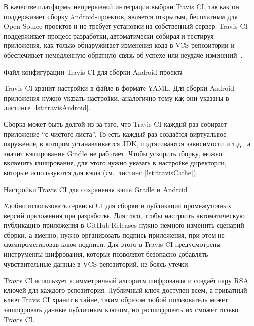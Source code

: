 В качестве платформы непрерывной интеграции выбран Travis CI, так как он поддерживает сборку Android-проектов, является открытым, бесплатным для Open Source проектов и не требует установки на собственный сервер.
Travis CI поддерживает процесс разработки, автоматически собирая и тестируя приложения, как только обнаруживает изменения кода в VCS репозитории и обеспечивает немедленную обратную связь об успехе или неудаче изменений~\cite{travis:docs}.

\begin{listing}[H]
  \caption{Файл конфигурации Travis CI для сборки Android-проекта}
  \label{lst:travisAndroid}
\end{listing}

Travis CI хранит настройки в файле  в формате YAML\@.
Для сборки Android-приложения нужно указать настройки, аналогично тому как они указаны в листинге~\ref{lst:travisAndroid}.

Сборка может быть долгой из-за того, что Travis CI каждый раз собирает приложение ``с чистого листа''.
То есть каждый раз создаётся виртуальное окружение, в котором устанавливается JDK, подтягиваются зависимости и т.д., а значит кэширование Gradle не работает.
Чтобы ускорить сборку, можно включить кэширование, для этого нужно указать в настройке  директории, которые используются для кэша (см.~листинг~\ref{lst:travisCache}).

\begin{listing}[h]
  \caption{Настройки Travis CI для сохранения кэша Gradle и Android}
  \label{lst:travisCache}
\end{listing}

Удобно использовать сервисы CI для сборки и публикации промежуточных версий приложения при разработке.
Для того, чтобы настроить автоматическую публикацию приложения в GitHub Releases нужно немного изменить сценарий сборки, а именно, нужно организовать подпись приложения, при этом не скомпрометировав ключ подписи.
Для этого в Travis CI предусмотрены инструменты шифрования, которые позволяют безопасно добавлять чувствительные данные в VCS репозиторий, не боясь утечки.

Travis CI использует асимметричный алгоритм шифрования и создаёт пару RSA ключей для каждого репозитория.
Публичный ключ доступен всем, а приватный ключ Travis CI хранит в тайне, таким образом любой пользователь может зашифровать данные публичным ключом, но расшифровать их сможет только Travis CI\@.

